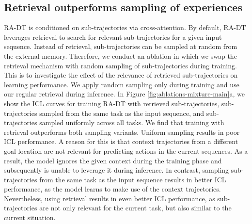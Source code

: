 \documentclass{article}
\begin{document}
\subsection{Retrieval outperforms sampling of experiences}
RA-DT is conditioned on sub-trajectories via cross-attention.
By default, RA-DT leverages retrieval to search for relevant sub-trajectories for a given input sequence.
Instead of retrieval, sub-trajectories can be sampled at random from the external memory. Therefore, we conduct an ablation in which we swap the retrieval mechanism with random sampling of sub-trajectories during training.
This is to investigate the effect of the relevance of retrieved sub-trajectories on learning performance.
We apply random sampling only during training and use our regular retrieval during inference.
In Figure \ref{fig:ablations-mixture-main}a,
we show the ICL curves for training RA-DT with retrieved sub-trajectories, sub-trajectories sampled from the same task as the input sequence, and sub-trajectories sampled uniformly across all tasks.
We find that training with retrieval outperforms both sampling variants.
Uniform sampling results in poor ICL performance.
A reason for this is that context trajectories from a different goal location are not relevant for predicting actions in the current sequences.
As a result, the model ignores the given context during the training phase and subsequently is unable to leverage it during inference.
In contrast, sampling sub-trajectories from the same task as the input sequence results in better ICL performance, as the model learns to make use of the context trajectories.
Nevertheless, using retrieval results in even better ICL performance, as sub-trajectories are not only relevant for the current task, but also similar to the current situation.
\end{document}

